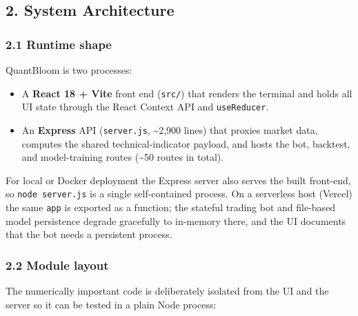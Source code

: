 \documentclass[
  11pt,
]{article}
\providecommand{\tightlist}{%
  \setlength{\itemsep}{0pt}\setlength{\parskip}{0pt}}
\begin{document}
\subsection{2. System Architecture}\label{system-architecture}

\subsubsection{2.1 Runtime shape}\label{runtime-shape}

QuantBloom is two processes:

\begin{itemize}
\tightlist
\item
  A \textbf{React 18 + Vite} front end (\texttt{src/}) that renders the
  terminal and holds all UI state through the React Context API and
  \texttt{useReducer}.
\item
  An \textbf{Express} API (\texttt{server.js}, \textasciitilde2,900
  lines) that proxies market data, computes the shared
  technical-indicator payload, and hosts the bot, backtest, and
  model-training routes (\textasciitilde50 routes in total).
\end{itemize}

For local or Docker deployment the Express server also serves the built
front-end, so \texttt{node\ server.js} is a single self-contained
process. On a serverless host (Vercel) the same \texttt{app} is exported
as a function; the stateful trading bot and file-based model persistence
degrade gracefully to in-memory there, and the UI documents that the bot
needs a persistent process.

\subsubsection{2.2 Module layout}\label{module-layout}

The numerically important code is deliberately isolated from the UI and
the server so it can be tested in a plain Node process:
\end{document}
